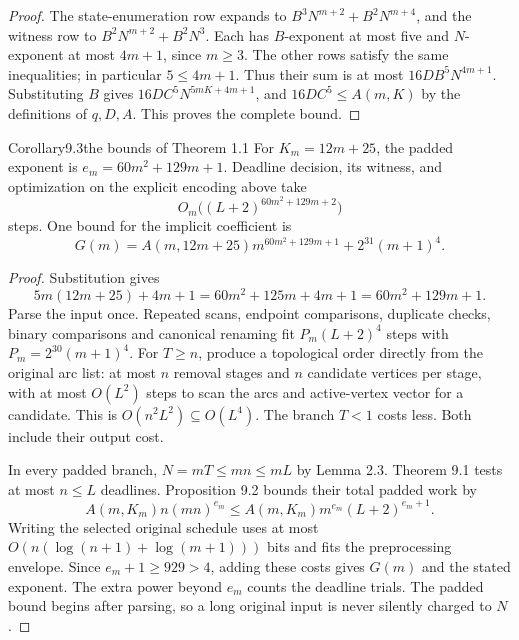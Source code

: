 \begin{proof}
The state-enumeration row expands to
$B^3N^{m+2}+B^2N^{m+4}$, and the witness row to
$B^2N^{m+2}+B^2N^3$. Each has $B$-exponent at most five and
$N$-exponent at most $4m+1$, since $m\geq3$. The other rows satisfy
the same inequalities; in particular $5\leq4m+1$.
Thus their sum is at most $16DB^5N^{4m+1}$. Substituting $B$ gives
$16DC^5N^{5mK+4m+1}$, and
$16DC^5\leq A(m,K)$ by the definitions of $q,D,A$.
This proves the complete bound.
\end{proof}

\begin{numbered}{Corollary}{9.3}{the bounds of Theorem 1.1}
For $K_m=12m+25$, the padded exponent is
$e_m=60m^2+129m+1$. Deadline decision, its witness, and optimization
on the explicit encoding above take
\[
 O_m\bigl((L+2)^{60m^2+129m+2}\bigr)
\]
steps. One bound for the implicit coefficient is
\[
 G(m)=A(m,12m+25)m^{60m^2+129m+1}+2^{31}(m+1)^4.
\]
\end{numbered}
\begin{proof}
Substitution gives
\[
 5m(12m+25)+4m+1=60m^2+125m+4m+1
 =60m^2+129m+1.
\]
Parse the input once. Repeated scans, endpoint comparisons, duplicate
checks, binary comparisons and canonical renaming fit
$P_m(L+2)^4$ steps with $P_m=2^{30}(m+1)^4$.
For $T\geq n$, produce a topological order directly from the original
arc list: at most $n$ removal stages and $n$ candidate vertices per
stage, with at most $O(L^2)$ steps to scan the arcs and active-vertex
vector for a candidate. This is $O(n^2L^2)\subseteq O(L^4)$.
The branch $T<1$ costs less. Both include their output cost.

In every padded branch, $N=mT\leq mn\leq mL$ by Lemma 2.3.
Theorem 9.1 tests at most $n\leq L$ deadlines. Proposition 9.2
bounds their total padded work by
\[
 A(m,K_m)n(mn)^{e_m}
 \leq A(m,K_m)m^{e_m}(L+2)^{e_m+1}.
\]
Writing the selected original schedule uses at most
$O(n(\log(n+1)+\log(m+1)))$ bits and fits the preprocessing envelope.
Since $e_m+1\geq929>4$, adding these costs gives $G(m)$ and the
stated exponent. The extra power beyond $e_m$ counts the deadline
trials. The padded bound begins after parsing, so a long original input
is never silently charged to $N$.
\end{proof}

